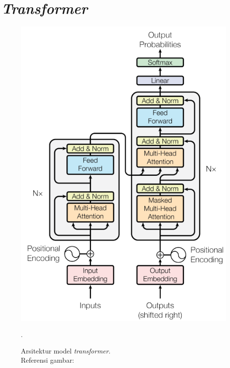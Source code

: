 \section{\emph{Transformer}}
\label{2.4}

\begin{figure}[h]
\includegraphics[scale=0.5]{assets/pics/transformer-achitecture.png}
\centering
\caption{Arsitektur model \emph{transformer}.\\\hspace{\textwidth}Referensi gambar: \citep{DBLP:journals/corr/VaswaniSPUJGKP17}}.
\end{figure}

